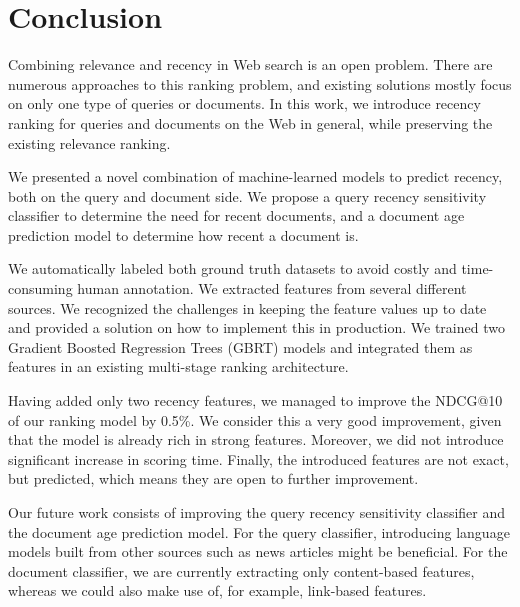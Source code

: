 \chapter{Conclusion}
\label{ch:conclusion}

Combining relevance and recency in Web search is an open problem. There are numerous approaches to this ranking problem, and existing solutions mostly focus on only one type of queries or documents. In this work, we introduce recency ranking for queries and documents on the Web in general, while preserving the existing relevance ranking.

We presented a novel combination of machine-learned models to predict recency, both on the query and document side. We propose a query recency sensitivity classifier to determine the need for recent documents, and a document age prediction model to determine how recent a document is.

We automatically labeled both ground truth datasets to avoid costly and time-consuming human annotation. We extracted features from several different sources. We recognized the challenges in keeping the feature values up to date and provided a solution on how to implement this in production. We trained two Gradient Boosted Regression Trees (GBRT) models and integrated them as features in an existing multi-stage ranking architecture.

Having added only two recency features, we managed to improve the NDCG@10 of our ranking model by 0.5\%. We consider this a very good improvement, given that the model is already rich in strong features. Moreover, we did not introduce significant increase in scoring time. Finally, the introduced features are not exact, but predicted, which means they are open to further improvement.

Our future work consists of improving the query recency sensitivity classifier and the document age prediction model. For the query classifier, introducing language models built from other sources such as news articles might be beneficial. For the document classifier, we are currently extracting only content-based features, whereas we could also make use of, for example, link-based features.
